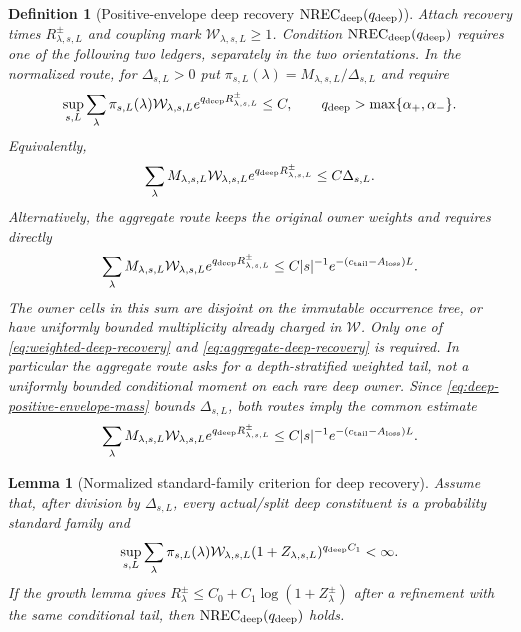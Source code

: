 \documentclass[11pt]{article}
\newtheorem{lemma}[theorem]{Lemma}
\newtheorem{definition}[theorem]{Definition}
\begin{document}
\begin{definition}[Positive-envelope deep recovery
$\mathrm{NREC}_{\rm deep}(q_{\rm deep})$]
\label{def:normalized-deep-recovery}
Attach recovery times $R^\pm_{\lambda,s,L}$ and coupling mark
$\mathcal W_{\lambda,s,L}\ge1$.  Condition
$\mathrm{NREC}_{\rm deep}(q_{\rm deep})$ requires one of the following two
ledgers, separately in the two orientations.  In the normalized route, for
$\Delta_{s,L}>0$ put
$\pi_{s,L}(\lambda)=M_{\lambda,s,L}/\Delta_{s,L}$ and require
\begin{equation}
\label{eq:normalized-deep-recovery}
 \sup_{s,L}\sum_\lambda\pi_{s,L}(\lambda)
 \mathcal W_{\lambda,s,L}e^{q_{\rm deep}R^\pm_{\lambda,s,L}}\le C,
 \qquad q_{\rm deep}>\max\{\alpha_+,\alpha_-\}.
\end{equation}
Equivalently,
\begin{equation}
\label{eq:weighted-deep-recovery}
 \sum_\lambda M_{\lambda,s,L}\mathcal W_{\lambda,s,L}
 e^{q_{\rm deep}R^\pm_{\lambda,s,L}}\le C\Delta_{s,L}.
\end{equation}
Alternatively, the aggregate route keeps the original owner weights and
requires directly
\begin{equation}
\label{eq:aggregate-deep-recovery}
 \sum_\lambda M_{\lambda,s,L}\mathcal W_{\lambda,s,L}
 e^{q_{\rm deep}R^\pm_{\lambda,s,L}}
 \le C|s|^{-1}e^{-(c_{\rm tail}-A_{\rm loss})L}.
\end{equation}
The owner cells in this sum are disjoint on the immutable occurrence tree,
or have uniformly bounded multiplicity already charged in $\mathcal W$.
Only one of \eqref{eq:weighted-deep-recovery} and
\eqref{eq:aggregate-deep-recovery} is required.  In particular the
aggregate route asks for a depth-stratified weighted tail, not a uniformly
bounded conditional moment on each rare deep owner.
Since \eqref{eq:deep-positive-envelope-mass} bounds $\Delta_{s,L}$, both
routes imply the common estimate
\begin{equation}
\label{eq:common-deep-recovery-envelope}
 \sum_\lambda M_{\lambda,s,L}\mathcal W_{\lambda,s,L}
 e^{q_{\rm deep}R^\pm_{\lambda,s,L}}
 \le C|s|^{-1}e^{-(c_{\rm tail}-A_{\rm loss})L}.
\end{equation}
\end{definition}

\begin{lemma}[Normalized standard-family criterion for deep recovery]
\label{lem:normalized-deep-recovery-criterion}
Assume that, after division by $\Delta_{s,L}$, every actual/split deep
constituent is a probability standard family and
\begin{equation}
\label{eq:normalized-initial-Z-moment}
 \sup_{s,L}\sum_\lambda\pi_{s,L}(\lambda)
 \mathcal W_{\lambda,s,L}
 (1+Z_{\lambda,s,L})^{q_{\rm deep}C_1}<\infty .
\end{equation}
If the growth lemma gives
$R^\pm_\lambda\le C_0+C_1\log(1+Z^\pm_\lambda)$ after a refinement with
the same conditional tail, then
$\mathrm{NREC}_{\rm deep}(q_{\rm deep})$ holds.
\end{lemma}
\end{document}
